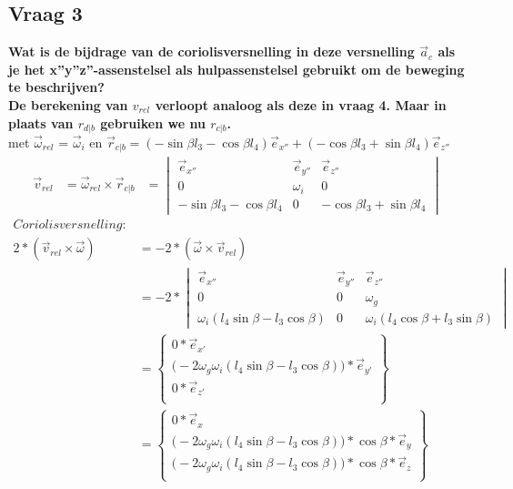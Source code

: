\documentclass[a4paper,10pt]{article}
\begin{document}
\subsection{Vraag 3}
\textbf{Wat is de bijdrage van de coriolisversnelling in deze versnelling $\vec{a}_c$ als je het x”y”z”-assenstelsel als hulpassenstelsel gebruikt om de beweging te beschrijven?}\\
\textbf{De berekening van $v_{rel}$ verloopt analoog als deze in vraag 4. Maar in plaats van $r_{d|b}$ gebruiken we nu $r_{c|b}$.}\\
met $\vec{\omega}_{rel}$ = $\vec{\omega}_i$ en $\vec{r}_{c|b} = (-\sin{\beta}l_3 - \cos{\beta} l_4)\vec{e}_{x''} + (-\cos{\beta} l_3 + \sin{\beta}l_4)\vec{e}_{z''}$
\begin{equation}
\begin{aligned}
\vec{v}_{rel} &= \vec{\omega}_{rel} \times \vec{r}_{c|b}
&=\begin{vmatrix}
\vec{e}_{x''} & \vec{e}_{y''} & \vec{e}_{z''}\\
0 & \omega_i & 0\\
-\sin{\beta}l_3 - \cos{\beta} l_4 & 0 &-\cos{\beta} l_3 + \sin{\beta} l_4
\end{vmatrix}
\end{aligned}
\end{equation}
\begin{equation}
\begin{aligned}
	Coriolisversnelling:\\ 2*( \vec{v}_{rel} \times  \vec{\omega}) &= -2 *( \vec{\omega} \times \vec{v}_{rel})\\
	&=-2 * \begin{vmatrix}
	\vec{e}_{x''} & \vec{e}_{y''} & \vec{e}_{z''}\\
	0 & 0 & \omega_g \\
	\omega_i  (l_4 \sin{\beta}-l_3  \cos{\beta}) & 0 & \omega_i (l_4\cos{\beta} + l_3  \sin{\beta})
	\end{vmatrix}\\
	&=  \begin{Bmatrix}
	0 * \vec{e}_{x'}\\
	\Big(-2\omega_g\omega_i(l_4 \sin{\beta}-l_3  \cos{\beta})\Big)*\vec{e}_{y'}\\
	0 * \vec{e}_{z'}\\
	\end{Bmatrix}\\
	&= \begin{Bmatrix}
		0 * \vec{e}_{x}\\
		\Big(-2\omega_g\omega_i(l_4 \sin{\beta}-l_3  \cos{\beta})\Big)*\cos{\beta}*\vec{e}_{y}\\
		\Big(-2\omega_g\omega_i(l_4 \sin{\beta}-l_3  \cos{\beta})\Big)*\cos{\beta} * \vec{e}_{z}\\
	\end{Bmatrix}
\end{aligned}
\end{equation}
\end{document}
